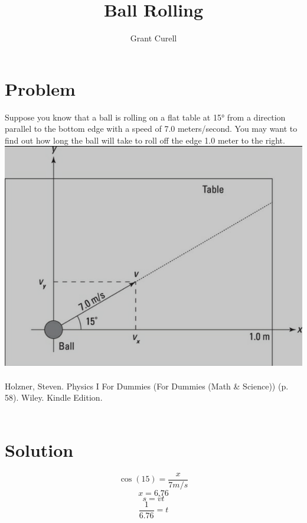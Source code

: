 \documentclass{article}
\title{Ball Rolling}
\author{Grant Curell}
\begin{document}
\maketitle{}
\section{Problem}
Suppose you know that a ball is rolling on a flat table at \ang{15} from a direction parallel to the bottom edge with a speed of 7.0 meters/second. You may want to find out how long the ball will take to roll off the edge 1.0 meter to the right.
\includegraphics[width=\columnwidth]{image}
\\\\
Holzner, Steven. Physics I For Dummies (For Dummies (Math \& Science)) (p. 58). Wiley. Kindle Edition.
\\\\
\section{Solution}
\[ \cos(15) = \frac{x}{7m/s} \]
\[ x=6.76 \]
\[ s=\bar{v}t \]
\[ \frac{1}{6.76}=t \]
\end{document}
